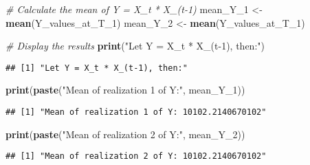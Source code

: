 \documentclass[
]{article}
\newenvironment{Shaded}{\begin{snugshade}}{\end{snugshade}}
\newcommand{\CommentTok}[1]{\textcolor[rgb]{0.56,0.35,0.01}{\textit{#1}}}
\newcommand{\FunctionTok}[1]{\textcolor[rgb]{0.13,0.29,0.53}{\textbf{#1}}}
\newcommand{\NormalTok}[1]{#1}
\newcommand{\OtherTok}[1]{\textcolor[rgb]{0.56,0.35,0.01}{#1}}
\newcommand{\StringTok}[1]{\textcolor[rgb]{0.31,0.60,0.02}{#1}}
\begin{document}
\begin{Shaded}
\begin{Highlighting}[]
\CommentTok{\# Calculate the mean of Y = X\_t * X\_(t{-}1)}
\NormalTok{mean\_Y\_1 }\OtherTok{\textless{}{-}} \FunctionTok{mean}\NormalTok{(Y\_values\_at\_T\_1)}
\NormalTok{mean\_Y\_2 }\OtherTok{\textless{}{-}} \FunctionTok{mean}\NormalTok{(Y\_values\_at\_T\_1)}

\CommentTok{\# Display the results}
\FunctionTok{print}\NormalTok{(}\StringTok{"Let Y = X\_t * X\_(t{-}1), then:"}\NormalTok{)}
\end{Highlighting}
\end{Shaded}

\begin{verbatim}
## [1] "Let Y = X_t * X_(t-1), then:"
\end{verbatim}

\begin{Shaded}
\begin{Highlighting}[]
\FunctionTok{print}\NormalTok{(}\FunctionTok{paste}\NormalTok{(}\StringTok{"Mean of realization 1 of Y:"}\NormalTok{, mean\_Y\_1))}
\end{Highlighting}
\end{Shaded}

\begin{verbatim}
## [1] "Mean of realization 1 of Y: 10102.2140670102"
\end{verbatim}

\begin{Shaded}
\begin{Highlighting}[]
\FunctionTok{print}\NormalTok{(}\FunctionTok{paste}\NormalTok{(}\StringTok{"Mean of realization 2 of Y:"}\NormalTok{, mean\_Y\_2))}
\end{Highlighting}
\end{Shaded}

\begin{verbatim}
## [1] "Mean of realization 2 of Y: 10102.2140670102"
\end{verbatim}
\end{document}
